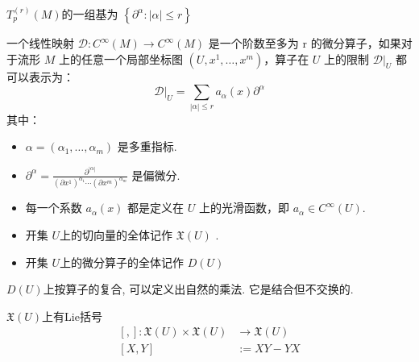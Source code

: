 \documentclass[../main.tex]{subfiles}
\begin{document}
    \begin{proposition}{}{}
        \(  T_{p}^{\left( r \right) }\left( M \right)   \)的一组基为 \(  \left\{  \partial ^{\alpha }: \left| \alpha  \right|\le r  \right\}  \)  
    \end{proposition}

    \begin{definition}{}{}
        一个线性映射 $\mathcal{D}: C^\infty(M) \to C^\infty(M)$ 是一个阶数至多为 r 的微分算子，如果对于流形 $M$ 上的任意一个局部坐标图 $(U, x^1, \dots, x^m)$，算子在 $U$ 上的限制 $\mathcal{D}|_U$ 都可以表示为：
$$\mathcal{D}|_U = \sum_{|\alpha| \le r} a_\alpha(x) \partial^\alpha$$
其中：
\begin{itemize}
    \item $\alpha = (\alpha_1, \dots, \alpha_m)$ 是多重指标.
    \item $\partial^\alpha = \frac{\partial^{|\alpha|}}{(\partial x^1)^{\alpha_1} \cdots (\partial x^m)^{\alpha_m}}$ 是偏微分.
    \item 
每一个系数 $a_\alpha(x)$ 都是定义在 $U$ 上的光滑函数，即 $a_\alpha \in C^\infty(U)$.
\end{itemize}



    \end{definition}
    
    \begin{definition}{}{}
       \begin{itemize}
        \item  开集 \(  U  \)上的切向量的全体记作 \(  \mathfrak{X}\left( U \right)   \)  .  
        \item  开集 \(  U  \)上的微分算子的全体记作 \(  D\left( U\right)   \)  
       \end{itemize}
       
    \end{definition}
 \begin{remark}
    \(  D\left( U \right)   \)上按算子的复合, 可以定义出自然的乘法. 它是结合但不交换的.  
 \end{remark}

  \begin{definition}{}{}
    \(  \mathfrak{X}\left( U \right)   \)上有Lie括号 \[
   \begin{aligned}
   \left[  ,  \right]   : \mathfrak{X}\left( U \right)\times \mathfrak{X}\left( U \right)&\to \mathfrak{X}\left( U \right)\\ 
     \left[ X,Y \right]&:=  XY-YX     
   \end{aligned}
    \] 
  \end{definition}
\end{document}
